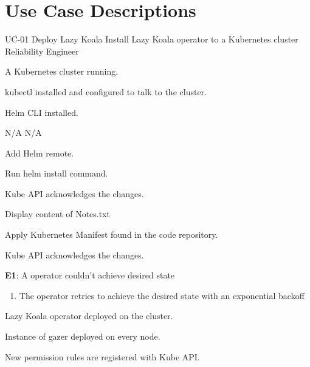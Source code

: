 {\let\clearpage\relax\chapter{Use Case Descriptions}\label{appendix:use-case-description}}

\UseCaseDescription
{UC-01}
{Deploy Lazy Koala}
{Install Lazy Koala operator to a Kubernetes cluster}
{Reliability Engineer}
{\begin{CompactItemizes}
    \item A Kubernetes cluster running.
    \item kubectl installed and configured to talk to the cluster.
    \item Helm CLI installed.
\end{CompactItemizes}}
{N/A}
{N/A}
{\begin{CompactEnumerate}
    \item Add Helm remote.
    \item Run helm install command.
    \item Kube API acknowledges the changes.
    \item Display content of Notes.txt
\end{CompactEnumerate}}
{{\begin{CompactEnumerate}
    \item Apply Kubernetes Manifest found in the code repository.
    \item Kube API acknowledges the changes.
\end{CompactEnumerate}}
{\textbf{E1}: A operator couldn’t achieve desired state
\vspace{-4mm}\begin{enumerate}
    \item The operator retries to achieve the desired state with an exponential backoff
\vspace{-7mm}\end{enumerate}}
{\begin{CompactItemizes}
    \item Lazy Koala operator deployed on the cluster.
    \item Instance of \ac{gazer} deployed on every node.
    \item New permission rules are registered with Kube API.
\end{CompactItemizes}}}


